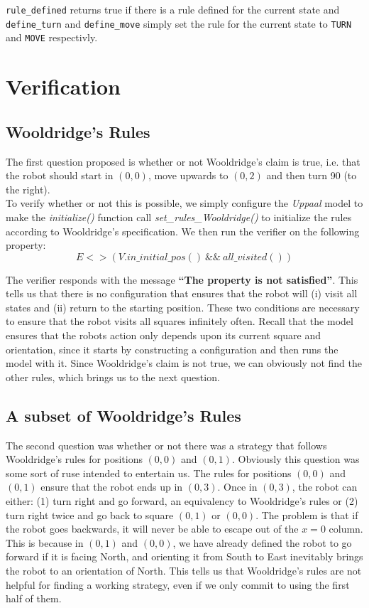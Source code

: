\documentclass{article}
\begin{document}
    \texttt{rule\_defined} returns true if there is a rule defined for the current state and \texttt{define\_turn} and \texttt{define\_move} simply set the rule for the current state to \texttt{TURN} and \texttt{MOVE} respectivly.




\section{Verification}

\subsection{Wooldridge's Rules}

The first question proposed is whether or not Wooldridge's claim is true, i.e. that the robot should start in $(0,0)$, move upwards to $(0,2)$ and then turn 90\degree{} (to the right).
\\
To verify whether or not this is possible, we simply configure the \textit{Uppaal} model to make the \textit{initialize()} function call \textit{set\_rules\_Wooldridge()} to initialize the rules according to Wooldridge's specification.
We then run the verifier on the following property:
\[ E<>(V.in\_initial\_pos() ~ \&\& ~ all\_visited()) \]

The verifier responds with the message \textbf{``The property is not satisfied''}.
This tells us that there is no configuration that ensures that the robot will (i) visit all states and (ii) return to the starting position. 
These two conditions are necessary to ensure that the robot visits all squares infinitely often.
Recall that the model ensures that the robots action only depends upon its current square and orientation, since it starts by constructing a configuration and then runs the model with it.
Since Wooldridge's claim is not true, we can obviously not find the other rules, which brings us to the next question.

\subsection{A subset of Wooldridge's Rules}

The second question was whether or not there was a strategy that follows Wooldridge's rules for positions $(0,0)$ and $(0,1)$.
Obviously this question was some sort of ruse intended to entertain us.
The rules for positions $(0,0)$ and $(0,1)$ ensure that the robot ends up in $(0,3)$.
Once in $(0,3)$, the robot can either: (1) turn right and go forward, an equivalency to Wooldridge's rules
or (2) turn right twice and go back to square $(0,1)$ or $(0,0)$.
The problem is that if the robot goes backwards, it will never be able to escape out of the $x=0$ column.
This is because in $(0,1)$ and $(0,0)$, we have already defined the robot to go forward if it is facing North, and orienting it from South to East inevitably brings the robot to an orientation of North.
This tells us that Wooldridge's rules are not helpful for finding a working strategy, even if we only commit to using the first half of them.
\end{document}
